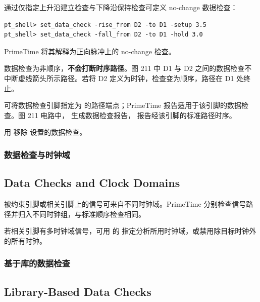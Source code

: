 
通过仅指定上升沿建立检查与下降沿保持检查可定义 no-change 数据检查：
\begin{lstlisting}
pt_shell> set_data_check -rise_from D2 -to D1 -setup 3.5
pt_shell> set_data_check -fall_from D2 -to D1 -hold 3.0
\end{lstlisting}

PrimeTime 将其解释为正向脉冲上的 no-change 检查。


数据检查为非顺序，\textbf{不会打断时序路径}。图 211 中 D1 与 D2 之间的数据检查不中断虚线箭头所示路径。若将 D2 定义为时钟，检查变为顺序，路径在 D1 处终止。


可将数据检查引脚指定为  的路径端点；PrimeTime 报告适用于该引脚的数据检查。图 211 电路中， 生成数据检查报告， 报告经该引脚的标准路径时序。

用  移除  设置的数据检查。

\subsubsection{数据检查与时钟域}
\subsection*{Data Checks and Clock Domains}

被约束引脚或相关引脚上的信号可来自不同时钟域。PrimeTime 分别检查信号路径并归入不同时钟组，与标准顺序检查相同。

若相关引脚有多时钟域信号，可用  的  指定分析所用时钟域，或禁用除目标时钟外的所有时钟。

\subsubsection{基于库的数据检查}
\subsection*{Library-Based Data Checks}

